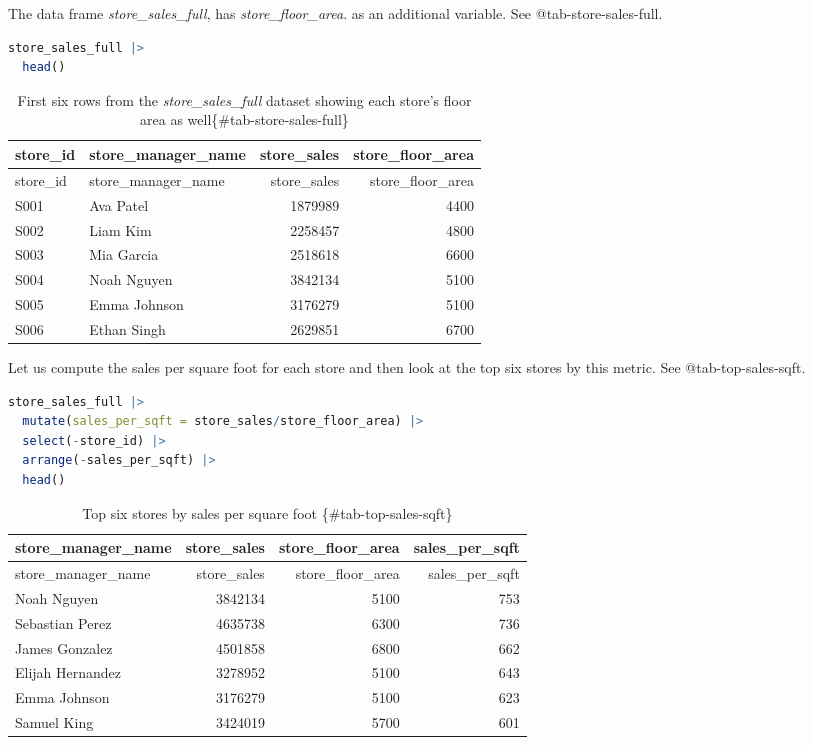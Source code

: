 \documentclass[
  12pt,
  letterpaper,
  DIV=11,
  numbers=noendperiod]{scrreprt}
\begin{document}
The data frame \emph{store\_sales\_full}, has \emph{store\_floor\_area}.
as an additional variable. See @tab-store-sales-full.

\begin{lstlisting}[language=R]
store_sales_full |> 
  head()
\end{lstlisting}

\begin{longtable}[]{@{}llrr@{}}
\caption{First six rows from the \emph{store\_sales\_full} dataset
showing each store's floor area as
well\{\#tab-store-sales-full\}}\tabularnewline
\toprule\noalign{}
store\_id & store\_manager\_name & store\_sales & store\_floor\_area \\
\midrule\noalign{}
\endfirsthead
\toprule\noalign{}
store\_id & store\_manager\_name & store\_sales & store\_floor\_area \\
\midrule\noalign{}
\endhead
\bottomrule\noalign{}
\endlastfoot
S001 & Ava Patel & 1879989 & 4400 \\
S002 & Liam Kim & 2258457 & 4800 \\
S003 & Mia Garcia & 2518618 & 6600 \\
S004 & Noah Nguyen & 3842134 & 5100 \\
S005 & Emma Johnson & 3176279 & 5100 \\
S006 & Ethan Singh & 2629851 & 6700 \\
\end{longtable}

Let us compute the sales per square foot for each store and then look at
the top six stores by this metric. See @tab-top-sales-sqft.

\begin{lstlisting}[language=R]
store_sales_full |> 
  mutate(sales_per_sqft = store_sales/store_floor_area) |> 
  select(-store_id) |> 
  arrange(-sales_per_sqft) |> 
  head() 
\end{lstlisting}

\begin{longtable}[]{@{}lrrr@{}}
\caption{Top six stores by sales per square foot
\{\#tab-top-sales-sqft\}}\tabularnewline
\toprule\noalign{}
store\_manager\_name & store\_sales & store\_floor\_area &
sales\_per\_sqft \\
\midrule\noalign{}
\endfirsthead
\toprule\noalign{}
store\_manager\_name & store\_sales & store\_floor\_area &
sales\_per\_sqft \\
\midrule\noalign{}
\endhead
\bottomrule\noalign{}
\endlastfoot
Noah Nguyen & 3842134 & 5100 & 753 \\
Sebastian Perez & 4635738 & 6300 & 736 \\
James Gonzalez & 4501858 & 6800 & 662 \\
Elijah Hernandez & 3278952 & 5100 & 643 \\
Emma Johnson & 3176279 & 5100 & 623 \\
Samuel King & 3424019 & 5700 & 601 \\
\end{longtable}
\end{document}
